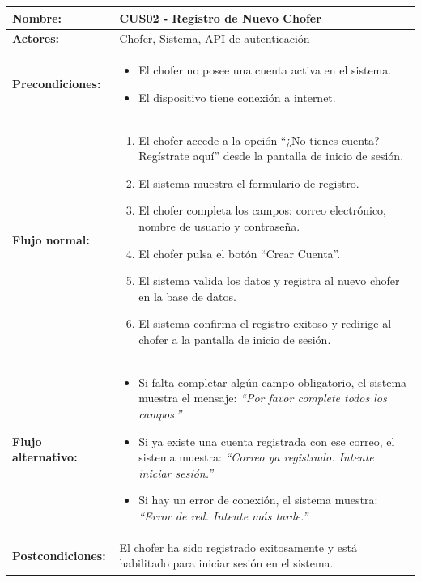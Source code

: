 \documentclass[12pt]{article}
\begin{document}
    \clearpage
    \begin{table}[!h]
    \centering
    \begin{tabular}{|p{3.5cm}|p{11cm}|}
    \hline
    \textbf{Nombre:} & CUS02 - Registro de Nuevo Chofer \\
    \hline
    \textbf{Actores:} & Chofer, Sistema, API de autenticación \\
    \hline
    \textbf{Precondiciones:} &
    \begin{itemize}
        \item El chofer no posee una cuenta activa en el sistema.
        \item El dispositivo tiene conexión a internet.
    \end{itemize}
    \\
    \hline
    \textbf{Flujo normal:} &
    \begin{enumerate}
        \item El chofer accede a la opción “¿No tienes cuenta? Regístrate aquí” desde la pantalla de inicio de sesión.
        \item El sistema muestra el formulario de registro.
        \item El chofer completa los campos: correo electrónico, nombre de usuario y contraseña.
        \item El chofer pulsa el botón “Crear Cuenta”.
        \item El sistema valida los datos y registra al nuevo chofer en la base de datos.
        \item El sistema confirma el registro exitoso y redirige al chofer a la pantalla de inicio de sesión.
    \end{enumerate}
    \\
    \hline
    \textbf{Flujo alternativo:} &
    \begin{itemize}
        \item[3a.] Si falta completar algún campo obligatorio, el sistema muestra el mensaje: \textit{“Por favor complete todos los campos.”}
        \item[4a.] Si ya existe una cuenta registrada con ese correo, el sistema muestra: \textit{“Correo ya registrado. Intente iniciar sesión.”}
        \item[4b.] Si hay un error de conexión, el sistema muestra: \textit{“Error de red. Intente más tarde.”}
    \end{itemize}
    \\
    \hline
    \textbf{Postcondiciones:} &
    El chofer ha sido registrado exitosamente y está habilitado para iniciar sesión en el sistema.
    \\
    \hline
    \end{tabular}
    \end{table}
\end{document}
